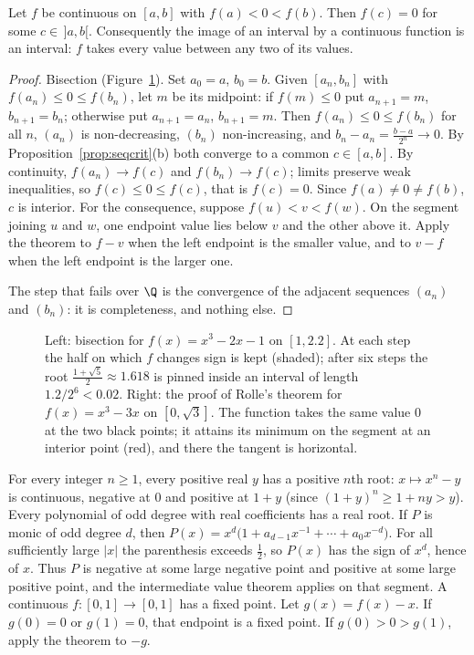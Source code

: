 \begin{theorem}\label{thm:ivt}
Let $f$ be continuous on $[a,b]$ with $f(a)<0<f(b)$. Then $f(c)=0$ for some $c\in\,]a,b[$. Consequently the image of an interval by a continuous function
is an interval: $f$ takes every value between any two of its values.
\end{theorem}
\begin{proof}
Bisection (Figure~\ref{fig:bisection}). Set $a_0=a$, $b_0=b$. Given $[a_n,b_n]$ with $f(a_n)\le0\le f(b_n)$, let $m$ be its midpoint: if $f(m)\le0$ put $a_{n+1}=m$, $b_{n+1}=b_n$; otherwise
put $a_{n+1}=a_n$, $b_{n+1}=m$. Then $f(a_n)\le0\le f(b_n)$ for all $n$, $(a_n)$ is non-decreasing, $(b_n)$ non-increasing, and $b_n-a_n=\frac{b-a}{2^n}\to0$.
By Proposition~\ref{prop:seqcrit}(b) both converge to a common $c\in[a,b]$. By continuity, $f(a_n)\to f(c)$ and $f(b_n)\to f(c)$; limits preserve weak
inequalities, so $f(c)\le0\le f(c)$, that is $f(c)=0$. Since $f(a)\ne0\ne f(b)$, $c$ is interior. For the consequence, suppose $f(u)<v<f(w)$. On the segment joining $u$ and $w$, one endpoint value lies below $v$ and the other above it. Apply the theorem to $f-v$ when the left endpoint is the smaller value, and to $v-f$ when the left endpoint is the larger one.

The step that fails over $\Q$ is the convergence of the adjacent sequences $(a_n)$ and $(b_n)$: it is completeness, and nothing else.
\end{proof}

\begin{figure}[ht]
\centering
{}
\caption{Left: bisection for $f(x)=x^3-2x-1$ on $[1,2.2]$. At each step the half on which $f$ changes sign is kept (shaded); after six steps the root $\frac{1+\sqrt5}2\approx1.618$ is pinned inside an interval of length $1.2/2^6<0.02$. Right: the proof of Rolle's theorem for $f(x)=x^3-3x$ on $[0,\sqrt3]$. The function takes the same value $0$ at the two black points; it attains its minimum on the segment at an interior point (red), and there the tangent is horizontal.}
\label{fig:bisection}
\end{figure}

\begin{examplex}
For every integer $n\ge1$, every positive real $y$ has a positive $n$th root: $x\mapsto x^n-y$ is continuous, negative at $0$ and positive at $1+y$ (since $(1+y)^n\ge1+ny>y$).
Every polynomial of odd degree with real coefficients has a real root. If $P$ is monic of odd degree $d$, then $P(x)=x^d\bigl(1+a_{d-1}x^{-1}+\cdots+a_0x^{-d}\bigr)$. For all sufficiently large $|x|$ the parenthesis exceeds $\frac12$, so $P(x)$ has the sign of $x^d$, hence of $x$. Thus $P$ is negative at some large negative point and positive at some large positive point, and the intermediate value theorem applies on that segment.
A continuous $f:[0,1]\to[0,1]$ has a fixed point. Let $g(x)=f(x)-x$. If $g(0)=0$ or $g(1)=0$, that endpoint is a fixed point. If $g(0)>0>g(1)$, apply the theorem to $-g$.
\end{examplex}

